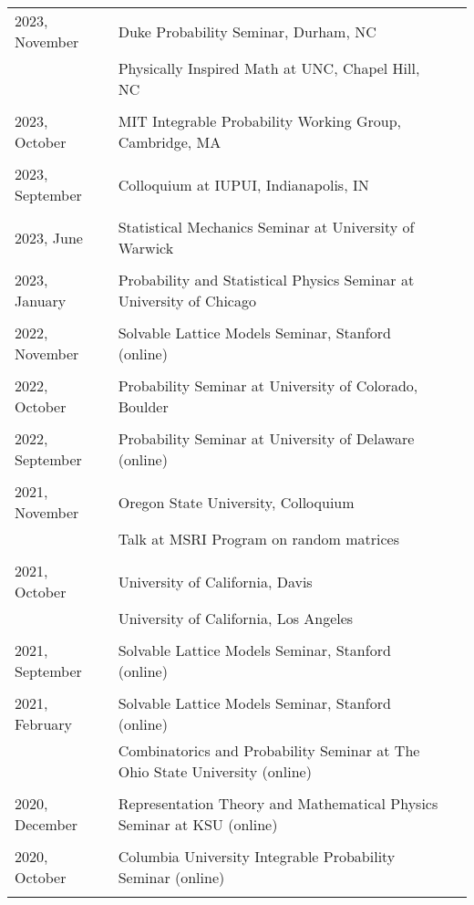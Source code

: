\documentclass[letterpaper,11pt]{article}
\begin{document}
\begin{longtable}{llc}
	2023, November
	& Duke Probability Seminar, Durham, NC
	\\ 
	& Physically Inspired Math at UNC, Chapel Hill, NC
	\\\\
	2023, October
	& MIT Integrable Probability Working Group, Cambridge, MA
	\\\\
	2023, September
	& Colloquium at IUPUI, Indianapolis, IN
	\\\\
	2023, June
	& Statistical Mechanics Seminar at University of Warwick
	\\\\
	2023, January
	& Probability and Statistical Physics Seminar at University of Chicago 
	\\\\
	2022, November
	& Solvable Lattice Models Seminar, Stanford (online)
	\\\\
	2022, October
	& Probability Seminar at University of Colorado, Boulder
	\\\\
	2022, September
	& Probability Seminar at University of Delaware (online)
	\\\\
	2021, November
	& Oregon State University, Colloquium
	\\
	& Talk at MSRI Program on random matrices
	\\\\
	2021, October
	& University of California, Davis
	\\
	& University of California, Los Angeles
	\\\\
	2021, September 
	& Solvable Lattice Models Seminar, Stanford (online)
	\\\\
	2021, February 
	& Solvable Lattice Models Seminar, Stanford (online)
	\\
	&
	Combinatorics and Probability Seminar at The Ohio State University (online)
	\\\\
	2020, December
	& Representation Theory and Mathematical Physics Seminar at KSU (online)
	\\\\
	2020, October
	& Columbia University Integrable Probability Seminar (online)
	\\
	&

\end{longtable}
\end{document}
